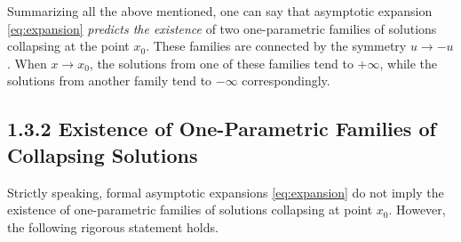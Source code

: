 Summarizing all the above mentioned, one can say that asymptotic expansion \eqref{eq:expansion} {\it predicts the existence} of two one-parametric families of solutions collapsing at the point $x_0$.
These families are connected by the symmetry $u \to -u$.
When $x \to x_0$, the solutions from one of these families tend to $+\infty$, while the solutions from another family tend to $-\infty$ correspondingly.

\subsection*{1.3.2 Existence of One-Parametric Families of Collapsing Solutions}

Strictly speaking, formal asymptotic expansions \eqref{eq:expansion} do not imply the existence of one-parametric families of solutions collapsing at point $x_0$.
However, the following rigorous statement holds.

